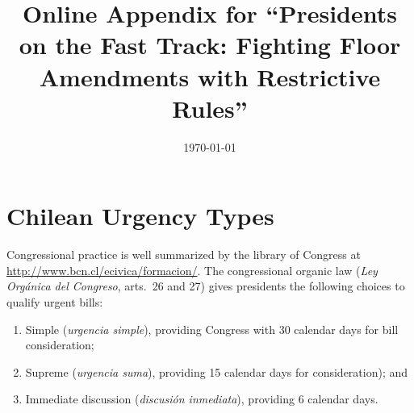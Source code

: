 \documentclass[letter,12pt]{article}
\begin{document}
\title{Online Appendix for ``Presidents on the Fast Track: Fighting Floor Amendments with Restrictive Rules''}

\date{\today}
\maketitle



\tableofcontents

\doublespacing

\renewcommand\thefigure{A.\arabic{figure}} 
\renewcommand\thetable{A.\arabic{table}} 



\section{Chilean Urgency Types}


Congressional practice is well summarized by the library of Congress at \url{http://www.bcn.cl/ecivica/formacion/}. The congressional organic law (\emph{Ley Orgánica del Congreso}, arts.\ 26 and 27) gives presidents the following choices to qualify urgent bills:

\begin{enumerate}
\item Simple (\emph{urgencia simple}), providing Congress with 30 calendar days for bill consideration;
\item Supreme (\emph{urgencia suma}), providing 15 calendar days for consideration); and
\item Immediate discussion (\emph{discusión inmediata}), providing 6 calendar days.
\end{enumerate}
\end{document}
